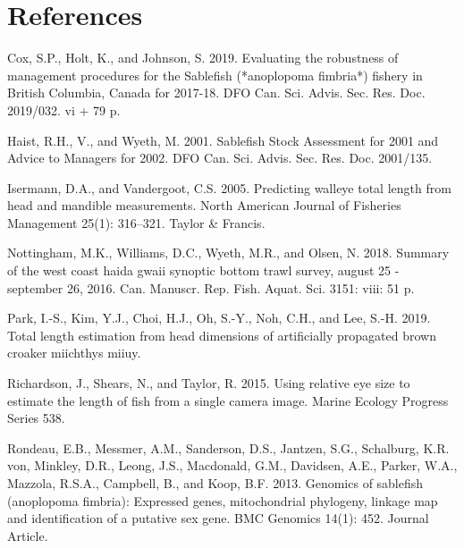 \documentclass[12pt]{article}\usepackage[]{graphicx}\usepackage[]{color}
\begin{document}
\clearpage

\hypertarget{references}{%
\section{References}\label{references}}

\noindent \vspace{-2em} \setlength{\parindent}{-0.2in} \setlength{\leftskip}{0.2in} \setlength{\parskip}{8pt}

\hypertarget{refs}{}
\begin{CSLReferences}{1}{0}
%
Cox, S.P., Holt, K., and Johnson, S. 2019. Evaluating the robustness of management procedures for the {Sablefish} (*anoplopoma fimbria*) fishery in {British Columbia, Canada} for 2017-18. DFO Can. Sci. Advis. Sec. Res. Doc. 2019/032. vi + 79 p.

%
Haist, R.H., V., and Wyeth, M. 2001. Sablefish {Stock Assessment} for 2001 and {Advice to Managers} for 2002. DFO Can. Sci. Advis. Sec. Res. Doc. 2001/135.

%
Isermann, D.A., and Vandergoot, C.S. 2005. Predicting walleye total length from head and mandible measurements. North American Journal of Fisheries Management 25(1): 316--321. Taylor \& Francis.

%
Nottingham, M.K., Williams, D.C., Wyeth, M.R., and Olsen, N. 2018. Summary of the west coast haida gwaii synoptic bottom trawl survey, august 25 - september 26, 2016. Can. Manuscr. Rep. Fish. Aquat. Sci. 3151: viii: 51 p.

%
Park, I.-S., Kim, Y.J., Choi, H.J., Oh, S.-Y., Noh, C.H., and Lee, S.-H. 2019. Total length estimation from head dimensions of artificially propagated brown croaker miichthys miiuy.

%
Richardson, J., Shears, N., and Taylor, R. 2015. Using relative eye size to estimate the length of fish from a single camera image. Marine Ecology Progress Series 538.

%
Rondeau, E.B., Messmer, A.M., Sanderson, D.S., Jantzen, S.G., Schalburg, K.R. von, Minkley, D.R., Leong, J.S., Macdonald, G.M., Davidsen, A.E., Parker, W.A., Mazzola, R.S.A., Campbell, B., and Koop, B.F. 2013. Genomics of sablefish (anoplopoma fimbria): Expressed genes, mitochondrial phylogeny, linkage map and identification of a putative sex gene. BMC Genomics 14(1): 452. Journal Article.


\end{CSLReferences}
\end{document}

